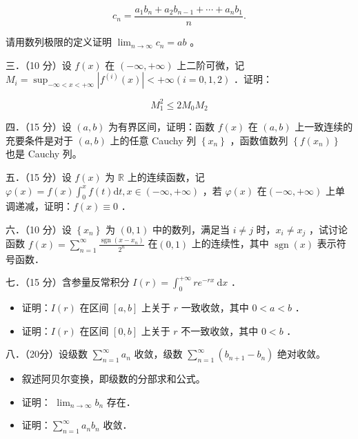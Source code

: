 \documentclass{article}
\begin{document}
\[
c_{n}=\frac{a_{1} b_{n}+a_{2} b_{n-1}+\cdots+a_{n} b_{1}}{n} .
\]

请用数列极限的定义证明 \(\lim _{n \rightarrow \infty} c_{n}=a b\) 。

三．（10 分）设 \(f(x)\) 在 \((-\infty,+\infty)\) 上二阶可微，记 \(M_{i}=\sup _{-\infty<x<+\infty}\left|f^{(i)}(x)\right|<+\infty(i=0,1,2)\) ．证明：

\[
M_{1}^{2} \leq 2 M_{0} M_{2}
\]

四．（15 分）设 \((a, b)\) 为有界区间，证明：函数 \(f(x)\) 在 \((a, b)\) 上一致连续的充要条件是对于 \((a, b)\) 上的任意 Cauchy 列 \(\left\{x_{n}\right\}\) ，函数值数列 \(\left\{f\left(x_{n}\right)\right\}\) 也是 Cauchy 列。

五．（15 分）设 \(f(x)\) 为 \(\mathbb{R}\) 上的连续函数，记 \(\varphi(x)=f(x) \int_{0}^{x} f(t) \mathrm{d} t, x \in(-\infty,+\infty)\) ，若 \(\varphi(x)\) 在\((-\infty,+\infty)\) 上单调递减，证明：\(f(x) \equiv 0\) ．

六．（10 分）设 \(\left\{x_{n}\right\}\) 为 \((0,1)\) 中的数列，满足当 \(i \neq j\) 时，\(x_{i} \neq x_{j}\) ，试讨论函数 \(f(x)=\sum_{n=1}^{\infty} \frac{\operatorname{sgn}\left(x-x_{n}\right)}{2^{n}}\) 在\((0,1)\) 上的连续性，其中 \(\operatorname{sgn}(x)\) 表示符号函数．

七．（15 分）含参量反常积分 \(I(r)=\int_{0}^{+\infty} r e^{-r x} \mathrm{~d} x\) ．

\begin{itemize}
  \item[（1）] 证明：\(I(r)\) 在区间 \([a, b]\) 上关于 \(r\) 一致收敛，其中 \(0<a<b\) ．
  \item[（2）] 证明：\(I(r)\) 在区间 \([0, b]\) 上关于 \(r\) 不一致收敛，其中 \(0<b\) ．
\end{itemize}

八．（20分）设级数 \(\sum_{n=1}^{\infty} a_{n}\) 收敛，级数 \(\sum_{n=1}^{\infty}\left(b_{n+1}-b_{n}\right)\) 绝对收敛。

\begin{itemize}
  \item[（1）] 叙述阿贝尔变换，即级数的分部求和公式。
  \item[（2）] 证明： \(\lim _{n \rightarrow \infty} b_{n}\) 存在．
  \item[（3）] 证明：\(\sum_{n=1}^{\infty} a_{n} b_{n}\) 收敛．
\end{itemize}
\end{document}
